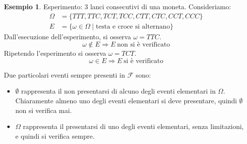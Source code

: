 \documentclass{article}
\theoremstyle{plain}
\theoremstyle{definition}
\newtheorem{esempio}{Esempio}[section]
\theoremstyle{remark}
\begin{document}
\begin{esempio}
	Esperimento: 3 lanci consecutivi di una moneta.
	Consideriamo:
	\begin{align*}
		\Omega&=\{TTT, TTC, TCT, TCC, CTT, CTC, CCT, CCC\}\\
		E&=\{\omega\in\Omega\mid\text{testa e croce si alternano}\}
	\end{align*}
	Dall'esecuzione dell'esperimento, si osserva $\omega=TTC$.
	\begin{equation*}
		\omega\notin E \Rightarrow E\ \text{non si è verificato}
	\end{equation*}
	Ripetendo l'esperimento si osserva $\omega=TCT$.
	\begin{equation*}
		\omega\in E \Rightarrow E\ \text{si è verificato}
	\end{equation*}
\end{esempio}
Due particolari eventi sempre presenti in $\mathcal{F}$ sono:
\begin{itemize}
	\item $\emptyset$ rappresenta il non presentarsi di alcuno degli eventi elementari in $\Omega$. Chiaramente almeno uno degli eventi elementari si deve presentare, quindi $\emptyset$ non si verifica mai.
	\item $\Omega$ rappresenta il presentarsi di uno degli eventi elementari, senza limitazioni, e quindi si verifica sempre.
\end{itemize}
\end{document}
